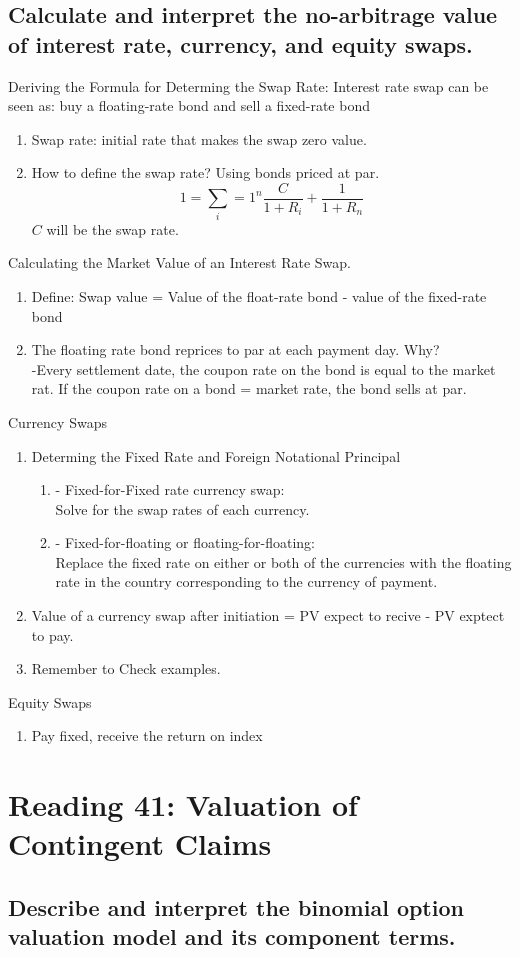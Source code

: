 \documentclass{article}
\newcommand{\be}{\begin{enumerate}}
\newcommand{\ee}{\end{enumerate}}
\begin{document}
\subsection{Calculate and interpret the no-arbitrage value of interest rate, currency,
and equity swaps.}
Deriving the Formula for Determing the Swap Rate: Interest rate swap 
can be seen as: buy a floating-rate bond and sell a fixed-rate bond
\be
    \item Swap rate: initial rate that makes the swap zero value.
    \item How to define the swap rate? Using bonds priced at par.
          $$
            1 = \sum_i=1^n\frac{C}{1+R_i} + \frac{1}{1+R_n}
          $$
          $C$ will be the swap rate.
\ee
Calculating the Market Value of an Interest Rate Swap.       
\be
    \item Define: Swap value = Value of the float-rate bond - value of the fixed-rate bond
    \item The floating rate bond reprices to par at each payment day. Why?
    \\-Every settlement date, the coupon rate on the bond is equal to the 
    market rat. If the coupon rate on a bond = market rate, the bond sells at par.
\ee
Currency Swaps
\be
    \item Determing the Fixed Rate and Foreign Notational Principal
    \be
        \item - Fixed-for-Fixed rate currency swap:
            \\ Solve for the swap rates of each currency.
        \item - Fixed-for-floating or floating-for-floating:
            \\ Replace the fixed rate on either or both of the currencies with
            the floating rate in the country corresponding to the currency of payment.
    \ee
    \item Value of a currency swap after initiation = PV expect to recive - PV exptect to pay.
    \item Remember to Check examples.
\ee
Equity Swaps
\be
    \item Pay fixed, receive the return on index
\ee

\section{Reading 41: Valuation of Contingent Claims}
\subsection{Describe and interpret the binomial option valuation model
and its component terms.}
\end{document}
